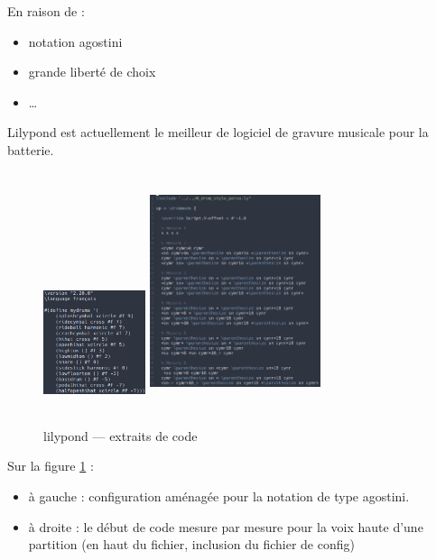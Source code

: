 En raison de :
\begin{itemize}
    \item notation agostini
    \item grande liberté de choix
    \item …
\end{itemize}

Lilypond est actuellement le meilleur de logiciel de gravure musicale pour la
batterie.

\begin{figure}[h]
    \centering
    \includegraphics[height=40mm, width=30mm]{
    z_images/3_methodes/transcription_manuelle/drum_perso_1}
    \includegraphics[height=70mm, width=50mm]{
    z_images/3_methodes/transcription_manuelle/extrait_code.png}
    \caption{lilypond — extraits de code}
    \label{extrait_code}
\end{figure}

Sur la figure \ref{extrait_code} :
\begin{itemize}
    \item à gauche : configuration aménagée pour la notation de type agostini.
    \item à droite : le début de code mesure par mesure pour la voix haute
        d’une partition (en haut du fichier, inclusion du fichier de config)
\end{itemize}

